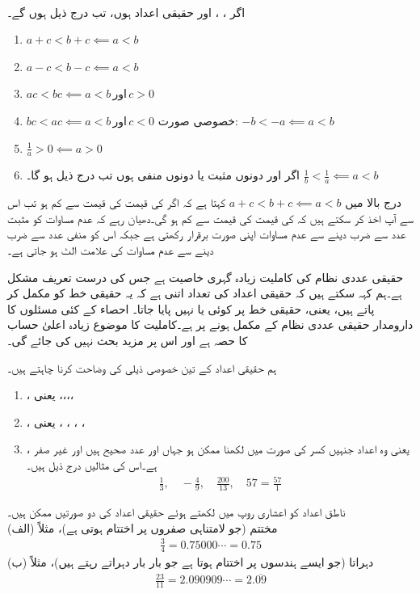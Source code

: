 \\
اگر ، ،  اور  حقیقی اعداد ہوں، تب درج ذیل ہوں گے۔
\begin{enumerate}[1.]
\item
$a+c<b+c\impliedby a<b$
\item
$a-c<b-c\impliedby a<b$
\item
$ac<bc\impliedby a<b \,\text{اور}\, c>0$
\item
$bc<ac\impliedby a<b\, \text{اور}\, c<0$\quad 
خصوصی صورت:
$-b<-a\impliedby a<b$
\item
$\frac{1}{a}>0\impliedby a>0$
\item
اگر  اور  دونوں مثبت یا دونوں منفی ہوں تب  درج ذیل ہو گا۔
$\frac{1}{b}<\frac{1}{a}\impliedby a<b$
\end{enumerate}

درج بالا میں $a+c<b+c\impliedby a<b$ کہتا ہے کہ اگر  کی قیمت  کی قیمت سے کم ہو تب اس سے آپ اخذ کر سکتے ہیں کہ  کی قیمت  کی قیمت سے کم ہو گی۔دھیان رہے کہ عدم مساوات کو مثبت عدد سے ضرب دینے سے عدم مساوات اپنی صورت برقرار رکھتی ہے جبکہ اس کو منفی عدد سے ضرب دینے سے عدم مساوات کی علامت الٹ ہو جاتی ہے۔ 

حقیقی عددی نظام کی کاملیت زیادہ گہری خاصیت ہے جس کی درست تعریف مشکل ہے۔ہم کہہ سکتے ہیں کہ حقیقی اعداد کی تعداد اتنی ہے کہ یہ حقیقی خط کو مکمل کر پاتے ہیں، یعنی، حقیقی خط پر کوئی  یا  نہیں پایا جاتا۔ احصاء کے کئی مسئلوں کا دارومدار حقیقی عددی نظام کے مکمل ہونے پر ہے۔کاملیت کا موضوع زیادہ اعلیٰ  حساب کا حصہ ہے اور اس پر مزید بحث نہیں کی جائے گی۔  

ہم حقیقی اعداد کے تین خصوصی ذیلی  کی وضاحت کرنا چاہتے ہیں۔
\begin{enumerate}[1.]
\item
{}، یعنی ،،،،
\item
{}، یعنی ، ، ، ،
\item
{}، یعنی وہ اعداد جنہیں کسر  کی صورت میں لکھنا ممکن ہو جہاں  اور  عدد صحیح ہیں اور  غیر صفر  ہے۔اس کی مثالیں درج ذیل ہیں۔
\begin{align*}
\frac{1}{3},\quad -\frac{4}{9},\quad \frac{200}{13}, \quad 57=\frac{57}{1}
\end{align*} 
\end{enumerate}
ناطق اعداد کو اعشاری روپ میں لکھتے ہوئے حقیقی اعداد کی دو صورتیں ممکن ہیں۔\\
(الف) \quad
مختتم (جو لامتناہی صفروں پر اختتام ہوتی ہے)، مثلاً
\begin{align*}
\frac{3}{4}=0.75000\cdots=0.75
\end{align*}
(ب)\quad
دہراتا (جو ایسے ہندسوں پر اختتام ہوتا ہے جو بار بار دہراتے رہتے ہیں)، مثلاً
\begin{align*}
\frac{23}{11}=2.090909\cdots=2.\overline{09}
\end{align*}

